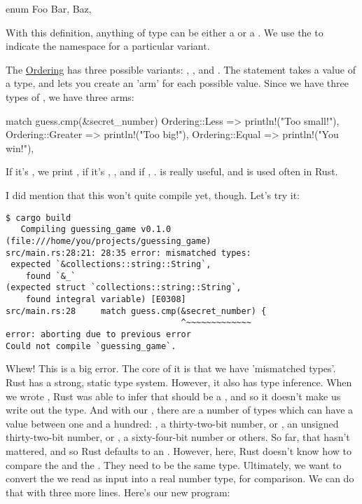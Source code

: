 \begin{rustc}
enum Foo {
  Bar,
  Baz,
}
\end{rustc}

With this definition, anything of type  can be either a  or a . We use the \code{::} 
to indicate the namespace for a particular  variant.

\blank

The \href{https://doc.rust-lang.org/std/cmp/enum.Ordering.html}{Ordering}  has three possible variants: ,
, and . The  statement takes a value of a type, and lets you create an 'arm' for each 
possible value. Since we have three types of , we have three arms:

\begin{rustc}
match guess.cmp(&secret_number) {
    Ordering::Less    => println!("Too small!"),
    Ordering::Greater => println!("Too big!"),
    Ordering::Equal   => println!("You win!"),
}
\end{rustc}

If it's , we print , if it's , , and if , . 
 is really useful, and is used often in Rust.

\blank

I did mention that this won't quite compile yet, though. Let's try it:

\begin{verbatim}
$ cargo build
   Compiling guessing_game v0.1.0 (file:///home/you/projects/guessing_game)
src/main.rs:28:21: 28:35 error: mismatched types:
 expected `&collections::string::String`,
    found `&_`
(expected struct `collections::string::String`,
    found integral variable) [E0308]
src/main.rs:28     match guess.cmp(&secret_number) {
                                   ^~~~~~~~~~~~~~
error: aborting due to previous error
Could not compile `guessing_game`.
\end{verbatim}

Whew! This is a big error. The core of it is that we have 'mismatched types'. Rust has a strong, static type system. However, it 
also has type inference. When we wrote , Rust was able to infer that  should be a 
, and so it doesn't make us write out the type. And with our , there are a number of types 
which can have a value between one and a hundred: , a thirty-two-bit number, or , an unsigned thirty-two-bit
number, or , a sixty-four-bit number or others. So far, that hasn't mattered, and so Rust defaults to an .
However, here, Rust doesn't know how to compare the  and the . They need to be the same type.
Ultimately, we want to convert the  we read as input into a real number type, for comparison. We can do that with 
three more lines. Here's our new program:

